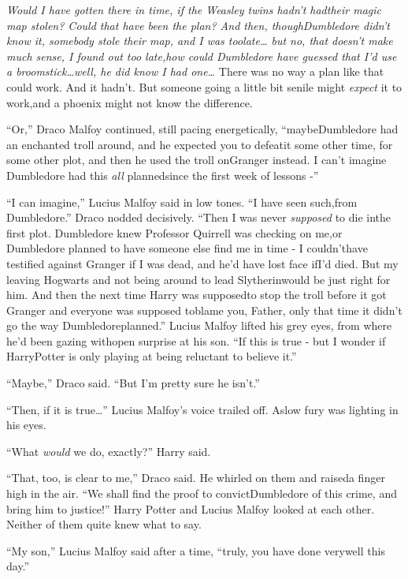 \emph{Would I have gotten there in time, if the Weasley twins hadn't hadtheir magic map stolen? Could that have been the plan? And then, thoughDumbledore didn't know it, somebody stole their map, and I was toolate\ldots{} but no, that doesn't make much sense, I found out too late,how could Dumbledore have guessed that I'd use a broomstick\ldots{}well, he did know I had one\ldots{}}
There was no way a plan like that could work.
And it hadn't.
But someone going a little bit senile might \emph{expect} it to work,and a phoenix might not know the difference.

``Or,'' Draco Malfoy continued, still pacing energetically, ``maybeDumbledore had an enchanted troll around, and he expected you to defeatit some other time, for some other plot, and then he used the troll onGranger instead. I can't imagine Dumbledore had this \emph{all} plannedsince the first week of lessons -''

``I can imagine,'' Lucius Malfoy said in low tones. ``I have seen such,from Dumbledore.''
Draco nodded decisively. ``Then I was never \emph{supposed} to die inthe first plot. Dumbledore knew Professor Quirrell was checking on me,or Dumbledore planned to have someone else find me in time - I couldn'thave testified against Granger if I was dead, and he'd have lost face ifI'd died. But my leaving Hogwarts and not being around to lead Slytherinwould be just right for him. And then the next time Harry was supposedto stop the troll before it got Granger and everyone was supposed toblame you, Father, only that time it didn't go the way Dumbledoreplanned.''
Lucius Malfoy lifted his grey eyes, from where he'd been gazing withopen surprise at his son. ``If this is true - but I wonder if HarryPotter is only playing at being reluctant to believe it.''

``Maybe,'' Draco said. ``But I'm pretty sure he isn't.''

``Then, if it is true\ldots{}'' Lucius Malfoy's voice trailed off. Aslow fury was lighting in his eyes.

``What \emph{would} we do, exactly?'' Harry said.

``That, too, is clear to me,'' Draco said. He whirled on them and raiseda finger high in the air. ``We shall find the proof to convictDumbledore of this crime, and bring him to justice!''
Harry Potter and Lucius Malfoy looked at each other.
Neither of them quite knew what to say.

``My son,'' Lucius Malfoy said after a time, ``truly, you have done verywell this day.''

